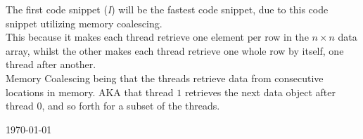 \documentclass[fontsize=11pt, paper=a4, titlepage]{article}
\begin{document}
The first code snippet (\textit{I}) will be the fastest code snippet, due to
this code snippet utilizing memory coalescing. \\

This because it makes each thread retrieve one element per row in the $n\times
n$ data array, whilst the other makes each thread retrieve one whole row by
itself, one thread after another. \\

Memory Coalescing being that the threads retrieve data from consecutive
locations in memory. AKA that thread $1$ retrieves the next data object after
thread $0$, and so forth for a subset of the threads.

\vfill
\hfill \large{\today}
\end{document}

